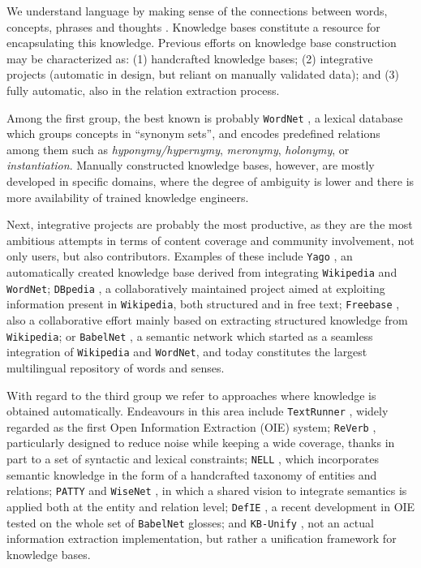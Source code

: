 We understand language by making sense of the connections between words, concepts, phrases and thoughts \citep{Havasietal2007}. Knowledge bases constitute a resource for encapsulating this knowledge. Previous efforts on knowledge base construction may be characterized as: (1) handcrafted knowledge bases; (2) integrative projects (automatic in design, but reliant on manually validated data); and (3) fully automatic, also in the relation extraction process.

Among the first group, the best known is probably \texttt{WordNet} \citep{Miller1995}, a lexical database which groups concepts in ``synonym sets'', and encodes predefined relations among them such as \textit{hyponymy/hypernymy}, \textit{meronymy}, \textit{holonymy}, or \textit{instantiation}. Manually constructed knowledge bases, however, are mostly developed in specific domains, where the degree of ambiguity is lower and there is more availability of trained knowledge engineers.

Next, integrative projects are probably the most productive, as they are the most ambitious attempts in terms of content coverage and community involvement, not only users, but also contributors. Examples of these include \texttt{Yago} \citep{Suchaneketal2007}, an automatically created knowledge base derived from integrating \texttt{Wikipedia} and \texttt{WordNet}; \texttt{DBpedia} \citep{Lehmanetal2014}, a collaboratively maintained project aimed at exploiting information present in \texttt{Wikipedia}, both structured and in free text; \texttt{Freebase} \citep{Bollacketal2008}, also a collaborative effort mainly based on extracting structured knowledge from \texttt{Wikipedia}; or \texttt{BabelNet} \citep{NavigliPonzetto2012}, a semantic network which started as a seamless integration of \texttt{Wikipedia} and \texttt{WordNet}, and today constitutes the largest multilingual repository of words and senses.

With regard to the third group we refer to approaches where knowledge is obtained automatically. 
Endeavours in this area include \texttt{TextRunner} \citep{Bankoetal2007}, widely regarded as the first Open Information Extraction (OIE) system; \texttt{ReVerb} \citep{Fader2011}, particularly designed to reduce noise while keeping a wide coverage, thanks in part to a set of syntactic and lexical constraints; \texttt{NELL} \citep{Carlson2010}, which incorporates semantic knowledge in the form of a handcrafted taxonomy of entities and relations; \texttt{PATTY} \citep{Nakasholeetal2012} and \texttt{WiseNet} \citep{MoroandNavigli2012,MoroandNavigli2013}, in which a shared vision to integrate semantics is applied both at the entity and relation level; \texttt{DefIE} \citep{DelliBovietal2015b}, a recent development in OIE tested on the whole set of \texttt{BabelNet} glosses; and \texttt{KB-Unify} \citep{DelliBovietal2015}, not an actual information extraction implementation, but rather a unification framework for knowledge bases.

